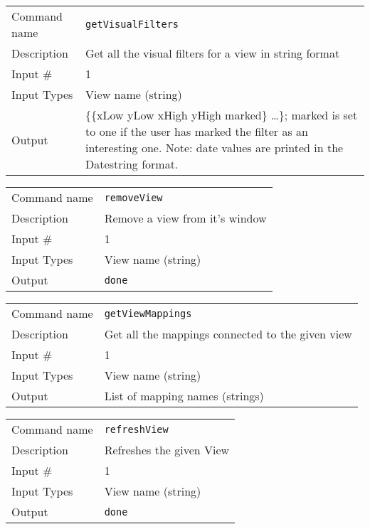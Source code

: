\bigskip

\noindent
\begin{tabular}{l|p{5in}}
\hline
Command name & {\tt getVisualFilters} \\
Description  & Get all the visual filters for a view in string format \\
Input \#     & 1 \\
Input Types  & View name (string) \\
Output       & \{\{xLow yLow xHigh yHigh marked\} \ldots \};
               marked is set to one if the user has marked the filter as
               an interesting one. Note: date values are printed in the
               Datestring format. \\
\hline
\end{tabular}

\bigskip

\noindent
\begin{tabular}{l|p{5in}}
\hline
Command name & {\tt removeView} \\
Description  & Remove a view from it's window \\
Input \#     & 1 \\
Input Types  & View name (string) \\
Output       & {\tt done} \\
\hline
\end{tabular}

\bigskip

\noindent
\begin{tabular}{l|p{5in}}
\hline
Command name & {\tt getViewMappings} \\
Description  & Get all the mappings connected to the given view \\
Input \#     & 1 \\
Input Types  & View name (string) \\
Output       & List of mapping names (strings) \\
\hline
\end{tabular}

\bigskip

\noindent
\begin{tabular}{l|p{5in}}
\hline
Command name & {\tt refreshView} \\
Description  & Refreshes the given View \\
Input \#     & 1 \\
Input Types  & View name (string) \\
Output       & {\tt done} \\
\hline
\end{tabular}

